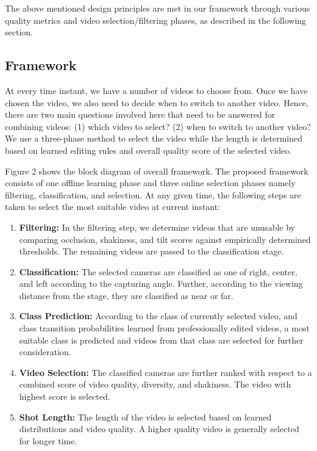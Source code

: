 \documentclass{sig-alternate-05-2015}
\begin{document}
The above mentioned design principles are met in our framework
through various quality metrics and video selection/filtering phases,
as described in the following section.

\subsection{Framework}

At every time instant, we have a number of videos to choose
from. Once we have chosen the video, we also need to decide when
to switch to another video. Hence, there are two main questions
involved here that need to be answered for combining videos: (1)
which video to select? (2) when to switch to another video? We
use a three-phase method to select the video while the length is
determined based on learned editing rules and overall quality score
of the selected video.

Figure 2 shows the block diagram of overall framework. The
proposed framework consists of one offline learning phase and three online selection phases namely filtering, classification, and selection.
At any given time, the following steps are taken to select the
most suitable video at current instant:

\begin{enumerate}
\item \textbf{Filtering:}
In the filtering step, we determine videos that are
unusable by comparing occlusion, shakiness, and tilt scores
against empirically determined thresholds. The remaining
videos are passed to the classification stage.
\item \textbf{Classification:}
The selected cameras are classified as one
of right, center, and left according to the capturing angle.
Further, according to the viewing distance from the stage,
they are classified as near or far.
\item \textbf{Class Prediction:}
According to the class of currently selected
video, and class transition probabilities learned from
professionally edited videos, a most suitable class is predicted
and videos from that class are selected for further consideration.
\item \textbf{Video Selection:}
The classified cameras are further ranked
with respect to a combined score of video quality, diversity,
and shakiness. The video with highest score is selected.
\item \textbf{Shot Length:}
The length of the video is selected based on
learned distributions and video quality. A higher quality video
is generally selected for longer time.
\end{enumerate}
\end{document}
